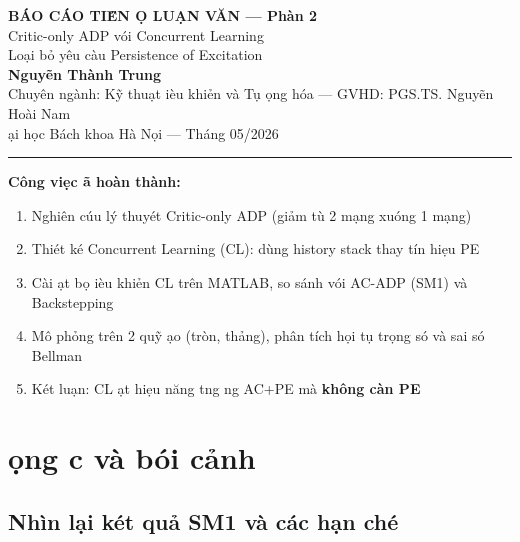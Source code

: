 \documentclass[12pt,a4paper]{article}
\begin{document}
\begin{center}
    {\Large\bfseries B\'{A}O C\'{A}O TI\H{E}N \DJ{}\d{O} LU\d{A}N V\u{A}N --- Ph\`{a}n 2} \\[8pt]
    {\large Critic-only ADP v\'{o}i Concurrent Learning \\
    Lo\d{a}i b\h{o} y\^{e}u c\`{a}u Persistence of Excitation} \\[14pt]
    \textbf{Nguy\~{e}n Th\`{a}nh Trung} \\[4pt]
    Chuy\^{e}n ng\`{a}nh: K\~{y} thu\d{a}t \DJ i\`{e}u khi\h{e}n v\`{a} T\d{u} \dj\d{o}ng h\'{o}a --- GVHD: PGS.TS. Nguy\~{e}n Ho\`{a}i Nam \\[2pt]
    \DJ\d{a}i h\d{o}c B\'{a}ch khoa H\`{a} N\d{o}i --- Th\'{a}ng 05/2026
\end{center}

\vspace{4pt}\hrule\vspace{8pt}

\noindent\textbf{C\^{o}ng vi\d{e}c \dj\~{a} ho\`{a}n th\`{a}nh:}
\begin{enumerate}[nosep]
    \item Nghi\^{e}n c\'{u}u l\'{y} thuy\'{e}t Critic-only ADP (gi\h{a}m t\`{u} 2 m\d{a}ng xu\'{o}ng 1 m\d{a}ng)
    \item Thi\'{e}t k\'{e} Concurrent Learning (CL): d\`{u}ng history stack thay t\'{i}n hi\d{e}u PE
    \item C\`{a}i \dj\d{a}t b\d{o} \dj i\`{e}u khi\h{e}n CL tr\^{e}n MATLAB, so s\'{a}nh v\'{o}i AC-ADP (SM1) v\`{a} Backstepping
    \item M\^{o} ph\h{o}ng tr\^{e}n 2 qu\~{y} \dj\d{a}o (tr\`{o}n, th\h{a}ng), ph\^{a}n t\'{i}ch h\d{o}i t\d{u} tr\d{o}ng s\'{o} v\`{a} sai s\'{o} Bellman
    \item K\'{e}t lu\d{a}n: CL \dj\d{a}t hi\d{e}u n\u{a}ng t\uhorn{}\ohorn{}ng \dj\uhorn{}\ohorn{}ng AC+PE m\`{a} \textbf{kh\^{o}ng c\`{a}n PE}
\end{enumerate}

\section{\DJ\d{o}ng c\ohorn{} v\`{a} b\'{o}i c\h{a}nh}

\subsection{Nh\`{i}n l\d{a}i k\'{e}t qu\h{a} SM1 v\`{a} c\'{a}c h\d{a}n ch\'{e}}
\end{document}
